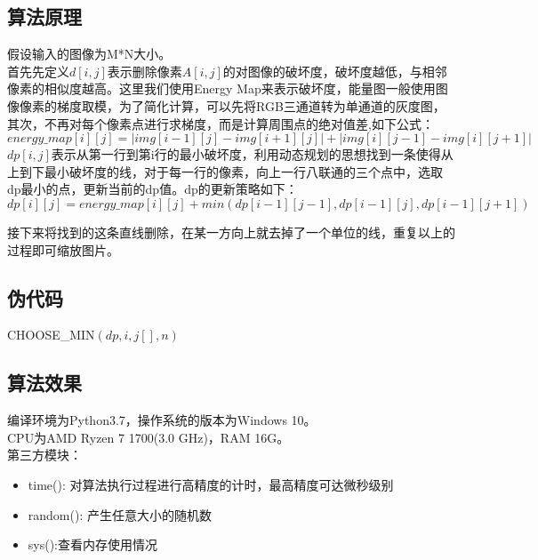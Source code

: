 \documentclass[UTF8]{ctexart}
\begin{document}
\subsection{算法原理}
假设输入的图像为M*N大小。\\
首先先定义$d[i, j]$表示删除像素$A[i, j]$的对图像的破坏度，破坏度越低，与相邻像素的相似度越高。这里我们使用Energy Map来表示破坏度，能量图一般使用图像像素的梯度取模，为了简化计算，可以先将RGB三通道转为单通道的灰度图，其次，不再对每个像素点进行求梯度，而是计算周围点的绝对值差,如下公式：
\begin{equation*}
    energy\_map[i][j] = \left\lvert img[i-1][j] - img[i+1][j] \right\rvert + \left\lvert img[i][j-1] - img[i][j+1] \right\rvert
\end{equation*}
$dp[i, j]$表示从第一行到第i行的最小破坏度，利用动态规划的思想找到一条使得从上到下最小破坏度的线，对于每一行的像素，向上一行八联通的三个点中，选取dp最小的点，更新当前的dp值。dp的更新策略如下：
\begin{equation*}
    dp[i][j] = energy\_map[i][j] + min(dp[i-1][j-1], dp[i-1][j], dp[i-1][j+1])
\end{equation*}

接下来将找到的这条直线删除，在某一方向上就去掉了一个单位的线，重复以上的过程即可缩放图片。

\subsection{伪代码}
\begin{algorithm}[H]
	\caption{CHOOSE\_MIN$(dp, i, j[], n)$}   %
    \begin{algorithmic}[1]  %
       
        \ENDIF
        
	\end{algorithmic}
\end{algorithm}

\subsection{算法效果}
编译环境为Python3.7，操作系统的版本为Windows 10。\\
CPU为AMD Ryzen 7 1700(3.0 GHz)，RAM 16G。\\
第三方模块：
\begin{itemize}
\item time(): 对算法执行过程进行高精度的计时，最高精度可达微秒级别
\item random(): 产生任意大小的随机数
\item sys():查看内存使用情况
\end{itemize}
\end{document}

